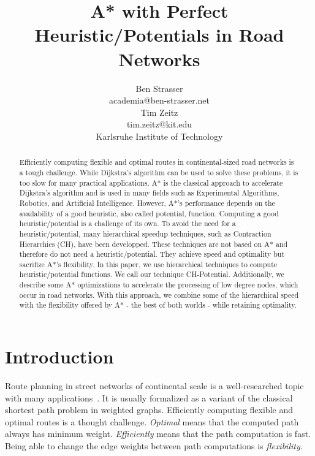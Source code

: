 \documentclass[letterpaper]{article} %
\title{A* with Perfect Heuristic/Potentials in Road Networks}
\author{Ben Strasser\\
academia@ben-strasser.net\\
\And
Tim Zeitz\\
tim.zeitz@kit.edu\\
Karlsruhe Institute of Technology
}
\begin{document}
\maketitle


\begin{abstract}
Efficiently computing flexible and optimal routes in continental-sized road networks is a tough challenge.
While Dijkstra's algorithm can be used to solve these problems, it is too slow for many practical applications.
A* is the classical approach to accelerate Dijkstra's algorithm and is used in many fields such as Experimental Algorithms, Robotics, and Artificial Intelligence.
However, A*'s performance depends on the availability of a good heuristic, also called potential, function.
Computing a good heuristic/potential is a challenge of its own.
To avoid the need for a heuristic/potential, many hierarchical speedup techniques, such as Contraction Hierarchies (CH), have been developped.
These techniques are not based on A* and therefore do not need a heuristic/potential.
They achieve speed and optimality but sacrifize A*'s flexibility.
In this paper, we use hierarchical techniques to compute heuristic/potential functions.
We call our technique CH-Potential.
Additionally, we describe some A* optimizations to accelerate the processing of low degree nodes, which occur in road networks.
With this approach, we combine some of the hierarchical speed with the flexibility offered by A* - the best of both worlds - while retaining optimality.
\end{abstract}

\section{Introduction}
\label{sec:intro}
Route planning in street networks of continental scale is a well-researched topic with many applications~\cite{bdgmpsww-rptn-16}.
It is usually formalized as a variant of the classical shortest path problem in weighted graphs.
Efficiently computing flexible and optimal routes is a thought challenge.
\emph{Optimal} means that the computed path always has minimum weight.
\emph{Efficiently} means that the path computation is fast.
Being able to change the edge weights between path computations is \emph{flexibility}.
\end{document}
